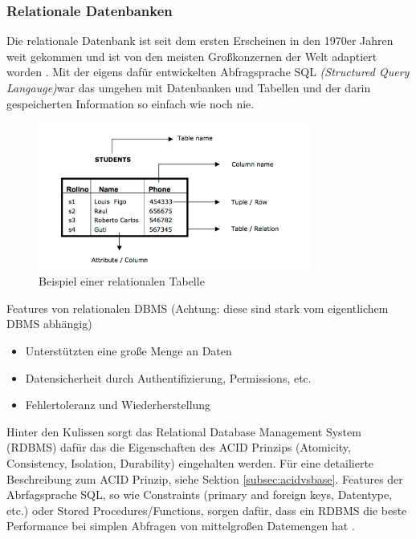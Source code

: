 \subsubsection{Relationale Datenbanken}
\label{subsec:relationaleDB}

Die relationale Datenbank ist seit dem ersten Erscheinen in den 1970er Jahren weit gekommen und ist von den meisten Großkonzernen der Welt adaptiert worden \cite{MELD.CH2-relationaleDB.ranking}. Mit der eigens dafür entwickelten Abfragsprache SQL \textit{(Structured Query Langauge)}war das umgehen mit Datenbanken und Tabellen und der darin gespeicherten Information so einfach wie noch nie.

\begin{figure}[!htb]\centering
	\includegraphics[width=0.8\textwidth]{images/relationaleTabelle}
	\caption{Beispiel einer relationalen Tabelle}
\end{figure}

Features von relationalen DBMS (Achtung: diese sind stark vom eigentlichem DBMS abhängig)
\begin{itemize}
\item Unterstützten eine große Menge an Daten
\item Datensicherheit durch Authentifizierung, Permissions, etc.
\item Fehlertoleranz und Wiederherstellung
\end{itemize}

Hinter den Kulissen sorgt das Relational Database Management System (RDBMS) dafür das die Eigenschaften des ACID Prinzips (Atomicity, Consistency, Isolation, Durability) eingehalten werden. Für eine detailierte Beschreibung zum ACID Prinzip, siehe Sektion \ref{subsec:acidvsbase}. Features der Abrfagsprache SQL, so wie Constraints (primary and foreign keys, Datentype, etc.) oder Stored Procedures/Functions, sorgen dafür, dass ein RDBMS die beste Performance bei simplen Abfragen von mittelgroßen Datemengen hat \cite{MELD.CH2-relationaleDB.performacne}.

